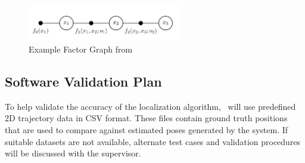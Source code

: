 \documentclass[12pt, titlepage]{article}
\begin{document}
\begin{figure}[h!]
  \begin{center}
    \includegraphics[width=0.6\textwidth]{factor_graph.png}
    \caption{Example Factor Graph from \cite{Dellaert2012}}
    \label{fig_factor} 
  \end{center}
\end{figure}




\subsection{Software Validation Plan}\label{plan_software}

To help validate the accuracy of the localization algorithm, \progname~will use predefined 2D trajectory data in CSV format. These files contain ground truth positions that are used to compare against estimated poses generated by the system. If suitable datasets are not available, alternate test cases and validation procedures will be discussed with the supervisor.


\end{document}

